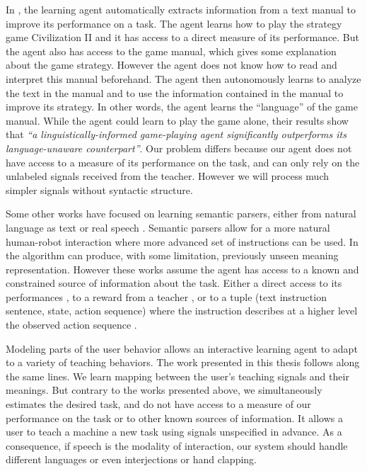 In \cite{branavan2011learning}, the learning agent automatically extracts information from a text manual to improve its performance on a task. The agent learns how to play the strategy game Civilization II and it has access to a direct measure of its performance. But the agent also has access to the game manual, which gives some explanation about the game strategy. However the agent does not know how to read and interpret this manual beforehand. The agent then autonomously learns to analyze the text in the manual and to use the information contained in the manual to improve its strategy. In other words, the agent learns the ``language'' of the game manual. While the agent could learn to play the game alone, their results show that \textit{``a linguistically-informed game-playing agent significantly outperforms its language-unaware counterpart''}. Our problem differs because our agent does not have access to a measure of its performance on the task, and can only rely on the unlabeled signals received from the teacher. However we will process much simpler signals without syntactic structure.

Some other works have focused on learning semantic parsers, either from natural language as text \cite{branavan2011learning,kim2012unsupervised} or real speech \cite{doshi2008spoken}. Semantic parsers allow for a more natural human-robot interaction where more advanced set of instructions can be used. In \cite{kim2012unsupervised} the algorithm can produce, with some limitation, previously unseen meaning representation. However these works assume the agent has access to a known and constrained source of information about the task. Either a direct access to its performances \cite{branavan2011learning}, to a reward from a teacher \cite{doshi2008spoken}, or to a tuple (text instruction sentence, state, action sequence) where the instruction describes at a higher level the observed action sequence \cite{kim2012unsupervised}.

\transition

Modeling parts of the user behavior allows an interactive learning agent to adapt to a variety of teaching behaviors. The work presented in this thesis follows along the same lines. We learn mapping between the user's teaching signals and their meanings. But contrary to the works presented above, we simultaneously estimates the desired task, and do not have access to a measure of our performance on the task or to other known sources of information. It allows a user to teach a machine a new task using signals unspecified in advance. As a consequence, if speech is the modality of interaction, our system should handle different languages or even interjections or hand clapping.

